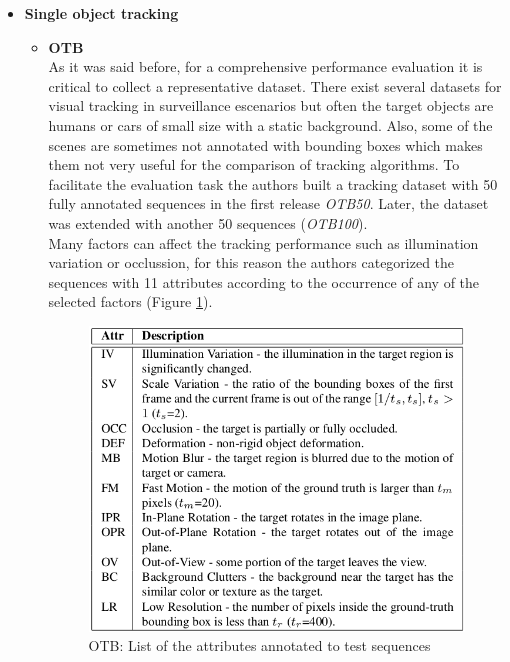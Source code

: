 \documentclass{bmvc2k}
\begin{document}
\begin{itemize}
\item \textbf{Single object tracking}
\begin{itemize}
\item \textbf{OTB} ~\cite{wu2013online}\\
As it was said before, for a comprehensive performance evaluation it is critical to collect a representative dataset. There exist several datasets for visual tracking in surveillance escenarios but often the target objects are humans or cars of small size with a static background. Also, some of the scenes are sometimes not annotated with bounding boxes which makes them not very useful for the comparison of tracking algorithms. To facilitate the evaluation task the authors built a tracking dataset with 50 fully annotated sequences in the first release \textit{OTB50}. Later, the dataset was extended with another 50 sequences (\textit{OTB100}).\\ Many factors can affect the tracking performance such as illumination variation or occlussion, for this reason the authors categorized the sequences with 11 attributes according to the occurrence of any of the selected factors (Figure \ref{fig:otb}).\\
\begin{figure}[h!]
\begin{center}
\includegraphics[scale=0.3]{otb_attributes.png}
\caption{OTB: List of the attributes annotated to test sequences ~\cite{wu2013online}}
\label{fig:otb}
\end{center}
\end{figure}

\end{itemize}
\end{itemize}
\end{document}
